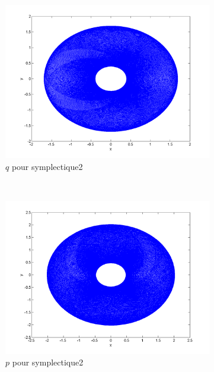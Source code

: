 \begin{figure}[!ht]
  \begin{subfigure}[b]{0.3\textwidth}
    \includegraphics[width=\textwidth]{images/Q1_symplectique2_q.png}
    \caption{$q$ pour symplectique2}
    \label{fig:q1_symplectique2_q}
  \end{subfigure}%
  ~
  \begin{subfigure}[b]{0.3\textwidth}
    \includegraphics[width=\textwidth]{images/Q1_symplectique2_p.png}
    \caption{$p$ pour symplectique2}
    \label{fig:q1_symplectique2_p}
  \end{subfigure}
  ~
  \begin{subfigure}[b]{0.3\textwidth}

\end{subfigure}
\end{figure}
